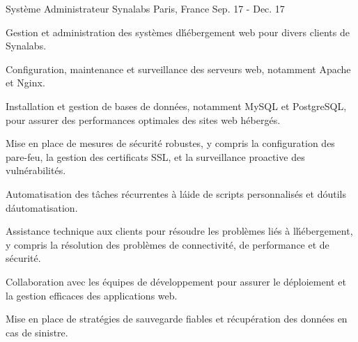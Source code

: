 \begin{cventries}
  \cventry
    {Système Administrateur} %
    {Synalabs} %
    {Paris, France} %
    {Sep. 17 - Dec. 17} %
    {
      \begin{cvitems} %
        \item {Gestion et administration des systèmes d\' hébergement web pour divers clients de Synalabs.}
        \item {Configuration, maintenance et surveillance des serveurs web, notamment Apache et Nginx.}
        \item {Installation et gestion de bases de données, notamment MySQL et PostgreSQL, pour assurer des performances optimales des sites web hébergés.}
        \item {Mise en place de mesures de sécurité robustes, y compris la configuration des pare-feu, la gestion des certificats SSL, et la surveillance proactive des vulnérabilités.}
        \item {Automatisation des tâches récurrentes à l\' aide de scripts personnalisés et d\' outils d\' automatisation.}
        \item {Assistance technique aux clients pour résoudre les problèmes liés à l\' hébergement, y compris la résolution des problèmes de connectivité, de performance et de sécurité.}
        \item {Collaboration avec les équipes de développement pour assurer le déploiement et la gestion efficaces des applications web.}
        \item {Mise en place de stratégies de sauvegarde fiables et récupération des données en cas de sinistre.}
      \end{cvitems}
    }


\end{cventries}
